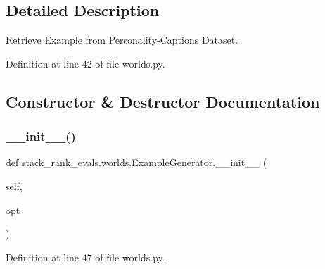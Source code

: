 \subsection{Detailed Description}
\begin{DoxyVerb}Retrieve Example from Personality-Captions Dataset.
\end{DoxyVerb}
 

Definition at line 42 of file worlds.\+py.



\subsection{Constructor \& Destructor Documentation}
\mbox{\label{classstack__rank__evals_1_1worlds_1_1ExampleGenerator_a6b15b72b85a0358bb6c171ef6b183c9d}} 
\subsubsection{\texorpdfstring{\+\_\+\+\_\+init\+\_\+\+\_\+()}{\_\_init\_\_()}\hspace{0.1cm}{\footnotesize\ttfamily [1/2]}}
{\footnotesize\ttfamily def stack\+\_\+rank\+\_\+evals.\+worlds.\+Example\+Generator.\+\_\+\+\_\+init\+\_\+\+\_\+ (\begin{DoxyParamCaption}\item[{}]{self,  }\item[{}]{opt }\end{DoxyParamCaption})}



Definition at line 47 of file worlds.\+py.


